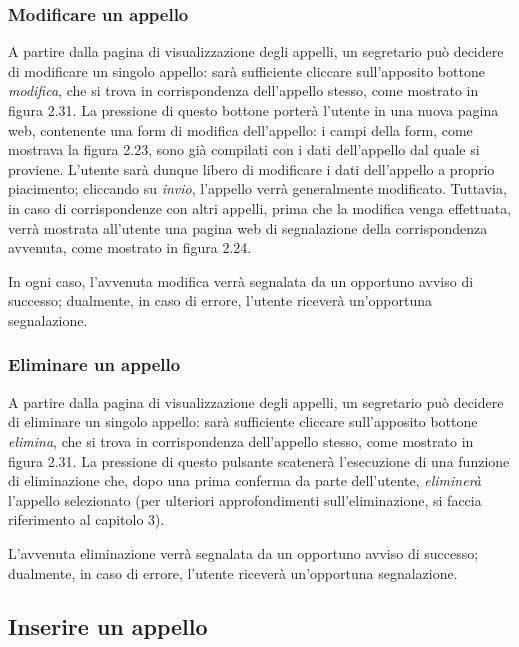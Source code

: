 \documentclass [a4paper,11pt]{book}
\begin{document}
\subsubsection{Modificare un appello}

A partire dalla pagina di visualizzazione degli appelli, un segretario può decidere di modificare un singolo appello: sarà sufficiente cliccare sull'apposito bottone \emph{modifica}, che si trova in corrispondenza dell'appello stesso, come mostrato in figura 2.31. La pressione di questo bottone porterà l'utente in una nuova pagina web, contenente una form di modifica dell'appello: i campi della form, come mostrava la figura 2.23, sono già compilati con i dati dell'appello dal quale si proviene. L'utente sarà dunque libero di modificare i dati dell'appello a proprio piacimento; cliccando su \emph{invio}, l'appello verrà generalmente modificato. Tuttavia, in caso di corrispondenze con altri appelli, prima che la modifica venga effettuata, verrà mostrata all'utente una pagina web di segnalazione della corrispondenza avvenuta, come mostrato in figura 2.24.

In ogni caso, l'avvenuta modifica verrà segnalata da un opportuno avviso di successo; dualmente, in caso di errore, l'utente riceverà un'opportuna segnalazione.

\medskip

\subsubsection{Eliminare un appello}

A partire dalla pagina di visualizzazione degli appelli, un segretario può decidere di eliminare un singolo appello: sarà sufficiente cliccare sull'apposito bottone \emph{elimina}, che si trova in corrispondenza dell'appello stesso, come mostrato in figura 2.31. La pressione di questo pulsante scatenerà l'esecuzione di una funzione di eliminazione che, dopo una prima conferma da parte dell'utente, \emph{eliminerà} l'appello selezionato (per ulteriori approfondimenti sull'eliminazione, si faccia riferimento al capitolo 3).

L'avvenuta eliminazione verrà segnalata da un opportuno avviso di successo; dualmente, in caso di errore, l'utente riceverà un'opportuna segnalazione.

\medskip

\subsection{Inserire un appello}
\end{document}
